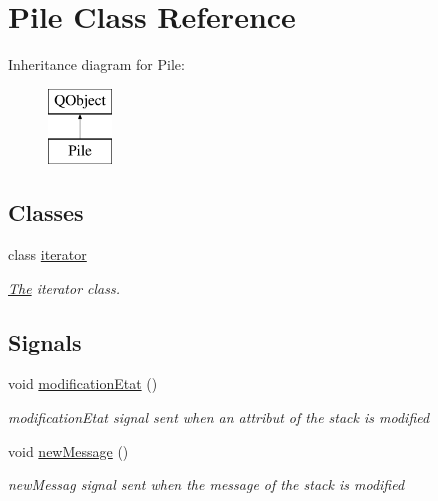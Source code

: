 \hypertarget{class_pile}{}\section{Pile Class Reference}
\label{class_pile}
Inheritance diagram for Pile\+:\begin{figure}[H]
\begin{center}
\leavevmode
\includegraphics[height=2.000000cm]{class_pile}
\end{center}
\end{figure}
\subsection*{Classes}
\begin{DoxyCompactItemize}
\item 
class \hyperlink{class_pile_1_1iterator}{iterator}
\begin{DoxyCompactList}\small\item\em \hyperlink{class_the}{The} iterator class. \end{DoxyCompactList}\end{DoxyCompactItemize}
\subsection*{Signals}
\begin{DoxyCompactItemize}
\item 
void \hyperlink{class_pile_ac55a0afb626baffd1019567cbaa7f4b2}{modification\+Etat} ()\hypertarget{class_pile_ac55a0afb626baffd1019567cbaa7f4b2}{}\label{class_pile_ac55a0afb626baffd1019567cbaa7f4b2}

\begin{DoxyCompactList}\small\item\em modification\+Etat signal sent when an attribut of the stack is modified \end{DoxyCompactList}\item 
void \hyperlink{class_pile_a9ee28bbf0994bc8f75873b567ba98834}{new\+Message} ()\hypertarget{class_pile_a9ee28bbf0994bc8f75873b567ba98834}{}\label{class_pile_a9ee28bbf0994bc8f75873b567ba98834}

\begin{DoxyCompactList}\small\item\em new\+Messag signal sent when the message of the stack is modified \end{DoxyCompactList}\end{DoxyCompactItemize}
